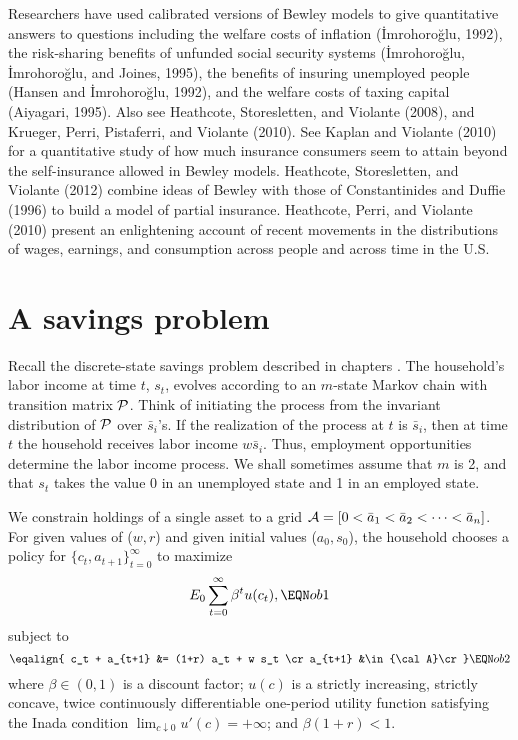   Researchers have used calibrated versions of Bewley models to give
quantitative answers to questions including the welfare costs of inflation
(\.Imrohoro\u glu, 1992),
the risk-sharing benefits of unfunded social security systems
(\.Imrohoro\u glu, \.Imrohoro\u glu, and Joines, 1995),
the benefits of insuring unemployed people
(Hansen and \.Imrohoro\u glu, 1992),
and the welfare costs of taxing capital (Aiyagari, 1995).  Also see
Heathcote,  Storesletten, and    Violante (2008), and
Krueger, Perri,  Pistaferri, and   Violante (2010).
See Kaplan and  Violante (2010) for a quantitative study of how much insurance consumers seem to attain
beyond the self-insurance allowed in Bewley models.
Heathcote, Storesletten, and  Violante (2012) combine ideas of Bewley with those of  Constantinides and Duffie (1996) to build
a model of partial insurance.  Heathcote,  Perri, and Violante (2010) present an enlightening account  of recent  movements
in the distributions of   wages, earnings, and consumption across people and across time in the U.S.  
 
%
%

\section{A savings problem}

Recall the discrete-state savings problem
described in chapters .  %
The household's labor income at time $t$, $s_t$,
evolves according to an $m$-state Markov chain with transition
matrix $\cal P$. Think of initiating the process from the invariant distribution
of $\cal P$ over $\bar s_i$'s.   If the realization of the process at $t$ is
$\bar s_i$, then at time $t$ the household receives labor income
$w \bar s_i$.   Thus, employment opportunities determine the
labor income process.
We shall sometimes assume that $m$ is 2, and that $s_t$
takes the value 0 in an unemployed state and 1 in an
employed state.

We constrain holdings of a single asset to a grid
${\cal A} = [ 0 <\bar a_1 < \bar a_2 < \cdots < \bar a_n]$.
For given values
of ($w,r$) and given initial values ($a_0, s_0$), the household
chooses a policy for
 $\{c_t, a_{t+1}\}_{t=0}^\infty$ to maximize
$$ E_0 \sum_{t=0}^\infty \beta^t u(c_t) , \EQN ob1 $$
subject to
$$\eqalign{ c_t + a_{t+1} &= (1+r) a_t + w s_t \cr
       a_{t+1} &\in {\cal A}\cr }\EQN ob2
$$
where
$\beta \in (0,1)$ is a discount factor; $u(c)$ is a strictly
increasing, strictly concave, twice continuously
differentiable one-period utility function satisfying
the Inada condition $\lim_{c \downarrow 0} u'(c) = +\infty$;
 and $\beta(1+r) < 1$.

